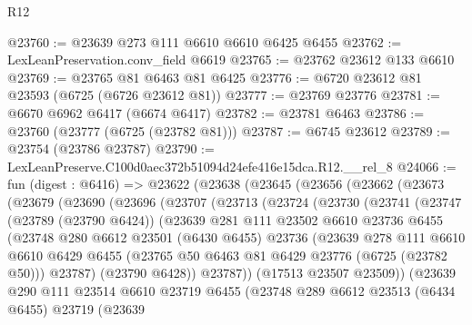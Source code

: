 \begin{lexlean}{R12}
\begin{coremodule}
@23760 := @23639 @273 @111 @6610 @6610 @6425 @6455
@23762 := LexLeanPreservation.conv_field @6619
@23765 := @23762 @23612 @133 @6610
@23769 := @23765 @81 @6463 @81 @6425
@23776 := @6720 @23612 @81 @23593 (@6725 (@6726 @23612 @81))
@23777 := @23769 @23776
@23781 := @6670 @6962 @6417 (@6674 @6417)
@23782 := @23781 @6463
@23786 := @23760 (@23777 (@6725 (@23782 @81)))
@23787 := @6745 @23612
@23789 := @23754 (@23786 @23787)
@23790 := LexLeanPreserve.C100d0aec372b51094d24efe416e15dca.R12.__rel_8
@24066 := fun (digest : @6416) =>
  @23622
    (@23638
      (@23645
        (@23656
          (@23662
            (@23673
              (@23679
                (@23690
                  (@23696
                    (@23707
                      (@23713
                        (@23724
                          (@23730
                            (@23741
                              (@23747
                                (@23789 (@23790 @6424))
                                (@23639
                                  @281
                                  @111
                                  @23502
                                  @6610
                                  @23736
                                  @6455
                                  (@23748
                                    @280
                                    @6612
                                    @23501
                                    (@6430 @6455)
                                    @23736
                                    (@23639
                                      @278
                                      @111
                                      @6610
                                      @6610
                                      @6429
                                      @6455
                                      (@23765 @50 @6463 @81 @6429 @23776 (@6725 (@23782 @50)))
                                      @23787)
                                    (@23790 @6428))
                                  @23787))
                              (@17513 @23507 @23509))
                            (@23639
                              @290
                              @111
                              @23514
                              @6610
                              @23719
                              @6455
                              (@23748
                                @289
                                @6612
                                @23513
                                (@6434 @6455)
                                @23719
                                (@23639

\end{coremodule}
\end{lexlean}
